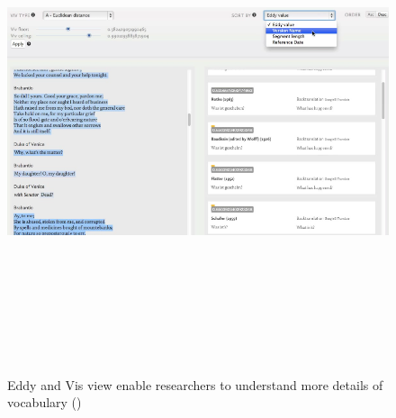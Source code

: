\begin{figure}[H] 
	\centering	
	\includegraphics[width=16cm, height=14cm]{Figs/Eddy-Viv-View}\\[1ex]
	\caption{Eddy and Vis view enable researchers to understand more details of vocabulary (\cite{Cheesman2012})}
	\label{fig:eddyVivView}
\end{figure} 



